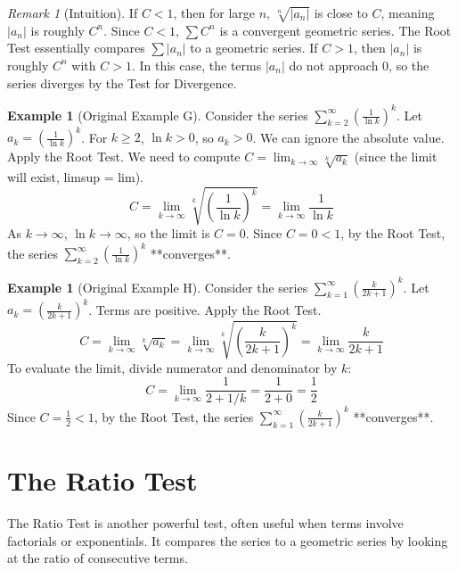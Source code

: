 \documentclass[11pt]{article}
\theoremstyle{plain}
\theoremstyle{definition}
\newtheorem{example}[theorem]{Example}
\theoremstyle{remark}
\newtheorem{remark}[theorem]{Remark}
\theoremstyle{adminstyle}
\begin{document}
\begin{remark}[Intuition]
If $C < 1$, then for large $n$, $\sqrt[n]{|a_n|}$ is close to $C$, meaning $|a_n|$ is roughly $C^n$. Since $C<1$, $\sum C^n$ is a convergent geometric series. The Root Test essentially compares $\sum |a_n|$ to a geometric series. If $C > 1$, then $|a_n|$ is roughly $C^n$ with $C>1$. In this case, the terms $|a_n|$ do not approach 0, so the series diverges by the Test for Divergence.
\end{remark}

\begin{example}[Original Example G] \label{ex:root_test_ln_k}
Consider the series $\sum_{k=2}^{\infty} \left(\frac{1}{\ln k}\right)^k$.
Let $a_k = \left(\frac{1}{\ln k}\right)^k$. For $k \ge 2$, $\ln k > 0$, so $a_k > 0$. We can ignore the absolute value.
Apply the Root Test. We need to compute $C = \lim_{k\to\infty} \sqrt[k]{a_k}$ (since the limit will exist, limsup = lim).
\[ C = \lim_{k\to\infty} \sqrt[k]{\left(\frac{1}{\ln k}\right)^k} = \lim_{k\to\infty} \frac{1}{\ln k} \]
As $k \to \infty$, $\ln k \to \infty$, so the limit is $C = 0$.
Since $C = 0 < 1$, by the Root Test, the series $\sum_{k=2}^{\infty} \left(\frac{1}{\ln k}\right)^k$ **converges**.
\end{example}

\begin{example}[Original Example H] \label{ex:root_test_k_over_2k_plus_1}
Consider the series $\sum_{k=1}^{\infty} \left(\frac{k}{2k+1}\right)^k$.
Let $a_k = \left(\frac{k}{2k+1}\right)^k$. Terms are positive.
Apply the Root Test.
\[ C = \lim_{k\to\infty} \sqrt[k]{a_k} = \lim_{k\to\infty} \sqrt[k]{\left(\frac{k}{2k+1}\right)^k} = \lim_{k\to\infty} \frac{k}{2k+1} \]
To evaluate the limit, divide numerator and denominator by $k$:
\[ C = \lim_{k\to\infty} \frac{1}{2 + 1/k} = \frac{1}{2 + 0} = \frac{1}{2} \]
Since $C = \frac{1}{2} < 1$, by the Root Test, the series $\sum_{k=1}^{\infty} \left(\frac{k}{2k+1}\right)^k$ **converges**.
\end{example}

\section{The Ratio Test}

The Ratio Test is another powerful test, often useful when terms involve factorials or exponentials. It compares the series to a geometric series by looking at the ratio of consecutive terms.
\end{document}
